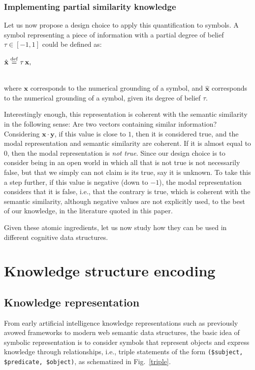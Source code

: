 \documentclass[sn-mathphys]{sn-jnl}
\newcommand{\defq}{\stackrel {\rm def}{=}}
\newcommand{\eqline}[1]{~\vspace{0.1cm}\\\centerline{$#1$}\vspace{0.1cm}\\}
\begin{document}
\subsubsection{Implementing partial similarity knowledge}

Let us now propose a design choice to apply this quantification to symbols. A symbol representing a piece of information with a partial degree of belief $\tau \in [-1, 1]$ could be defined as:
\eqline{\hat{\mathbf{x}} \defq \tau \, \mathbf{x},}
where $\mathbf{x}$ corresponds to the numerical grounding of a symbol, and $\hat{\mathbf{x}}$ corresponds to the numerical grounding of a symbol, given its degree of belief $\tau$.

Interestingly enough, this representation is coherent with the semantic similarity in the following sense: Are two vectors containing similar information? Considering $\mathbf{x} \cdot \mathbf{y}$, if this value is close to $1$, then it is considered true, and the modal representation and semantic similarity are coherent. If it is almost equal to $0$, then the modal representation is {\em not true}. Since our design choice is to consider being in an open world in which all that is not true is not necessarily false, but that we simply can not claim is its true, say it is unknown. To take this a step further, if this value is negative (down to $-1$), the modal representation considers that it is false, i.e., that the contrary is true, which is coherent with the semantic similarity, although negative values are not explicitly used, to the best of our knowledge, in the literature quoted in this paper.

Given these atomic ingredients, let us now study how they can be used in different cognitive data structures.

\section{Knowledge structure encoding}

\subsection{Knowledge representation}

From early artificial intelligence knowledge representations such as previously avowed frameworks to modern web semantic data structures, the basic idea of symbolic representation is to consider symbols that represent objects and express knowledge through relationships, i.e., triple statements of the form {\tt (\$subject, \$predicate, \$object)}, as schematized in Fig.~\ref{triple}.
\end{document}
